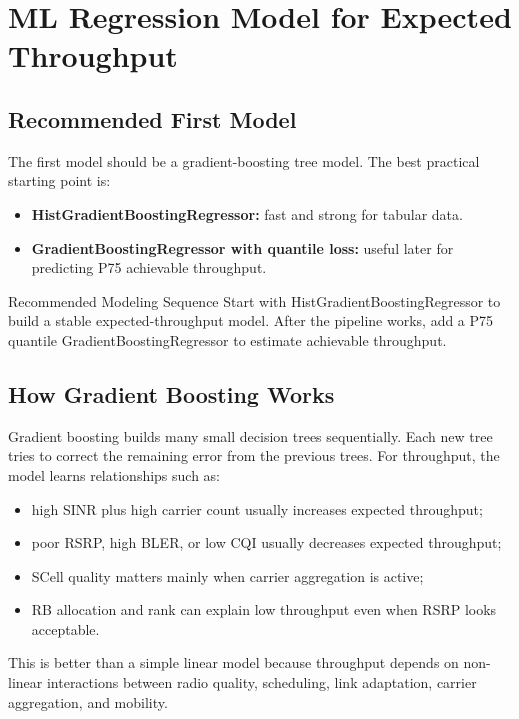 \documentclass[12pt,a4paper]{article}
\begin{document}
\section{ML Regression Model for Expected Throughput}

\subsection{Recommended First Model}

The first model should be a gradient-boosting tree model. The best practical starting point is:

\begin{itemize}
    \item \textbf{HistGradientBoostingRegressor:} fast and strong for tabular data.
    \item \textbf{GradientBoostingRegressor with quantile loss:} useful later for predicting P75 achievable throughput.
\end{itemize}

\begin{successbox}{Recommended Modeling Sequence}
Start with HistGradientBoostingRegressor to build a stable expected-throughput model. After the pipeline works, add a P75 quantile GradientBoostingRegressor to estimate achievable throughput.
\end{successbox}

\subsection{How Gradient Boosting Works}

Gradient boosting builds many small decision trees sequentially. Each new tree tries to correct the remaining error from the previous trees. For throughput, the model learns relationships such as:

\begin{itemize}
    \item high SINR plus high carrier count usually increases expected throughput;
    \item poor RSRP, high BLER, or low CQI usually decreases expected throughput;
    \item SCell quality matters mainly when carrier aggregation is active;
    \item RB allocation and rank can explain low throughput even when RSRP looks acceptable.
\end{itemize}

This is better than a simple linear model because throughput depends on non-linear interactions between radio quality, scheduling, link adaptation, carrier aggregation, and mobility.
\end{document}
